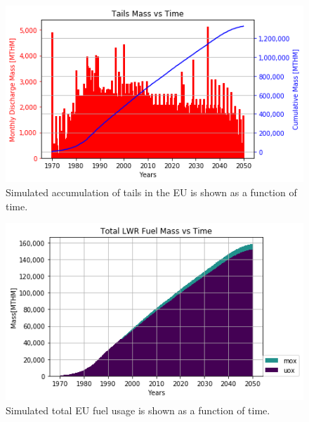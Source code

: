 \begin{figure}[htbp!]
	\begin{center}
		\includegraphics[scale=0.7]{./images/eu_future/tails.png}
	\end{center}
        \caption{Simulated accumulation of tails in the \gls{EU} is shown as a function of time.}
	\label{fig:eu_tail}
\end{figure}

\begin{figure}[htbp!]
	\begin{center}
		\includegraphics[scale=0.7]{./images/eu_future/total_fuel.png}
	\end{center}
\caption{Simulated total \gls{EU} fuel usage is shown as a function of time.}
	\label{fig:eu_fuel}
\end{figure}


